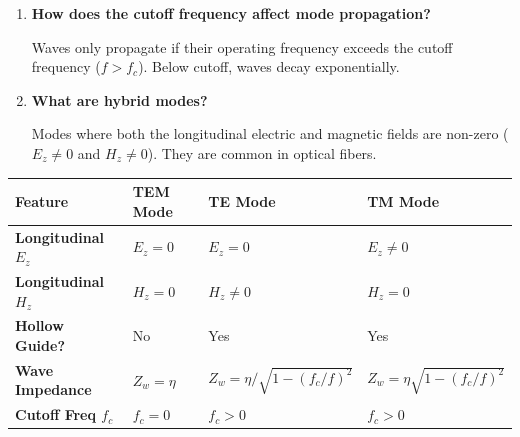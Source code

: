 \documentclass[12pt,a4paper]{article}
\newcommand{\Q}[1]{\textbf{#1}\par\noindent\ignorespaces}
\renewcommand{\arraystretch}{1.45}
\begin{document}
\begin{tcolorbox}[exambox, title={\textbf{Frequently Asked / Viva Questions}}]
\begin{enumerate}[topsep=0pt, label=\textbf{Q\arabic*.}, itemsep=5pt]
  \item \Q{How does the cutoff frequency affect mode propagation?}
    Waves only propagate if their operating frequency exceeds the cutoff frequency ($f > f_c$). Below cutoff, waves decay exponentially.
  \item \Q{What are hybrid modes?}
    Modes where both the longitudinal electric and magnetic fields are non-zero ($E_z \ne 0$ and $H_z \ne 0$). They are common in optical fibers.
\end{enumerate}
\end{tcolorbox}

\begin{tcolorbox}[tikzbox, title={Comparison of Wave Propagation Modes}]
\renewcommand{\arraystretch}{1.4}
\par\noindent
{\renewcommand{\arraystretch}{1.9}%
\begin{tabularx}{\linewidth}{|B{3.2cm}|Y|Y|Y|}\hline
\textbf{Feature} & \textbf{TEM Mode} & \textbf{TE Mode} & \textbf{TM Mode} \\
\hline
\textbf{Longitudinal $E_z$} & $E_z = 0$ & $E_z = 0$ & $E_z \ne 0$ \\[4pt]
\hline
\textbf{Longitudinal $H_z$} & $H_z = 0$ & $H_z \ne 0$ & $H_z = 0$ \\[4pt]
\hline
\textbf{Hollow Guide?} & No & Yes & Yes \\
\hline
\textbf{Wave Impedance} & $Z_w = \eta$ & $Z_w = \eta / \sqrt{1-(f_c/f)^2}$ & $Z_w = \eta \sqrt{1-(f_c/f)^2}$ \\[6pt]
\hline
\textbf{Cutoff Freq $f_c$} & $f_c = 0$ & $f_c > 0$ & $f_c > 0$ \\[4pt]
\hline
\end{tabularx}
}
\end{tcolorbox}
\end{document}
